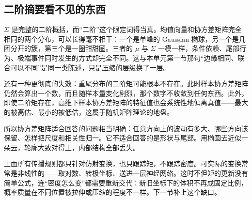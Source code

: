 \subsection{二阶摘要看不见的东西}

\(\Sigma\) 是完整的二阶概括，而``二阶''这个限定词得当真。均值向量和协方差矩阵完全相同的两个分布，可以长得毫不相干：一个是单峰的 Gaussian 椭球，另一个是几团分开的簇，第三个是一圈甜甜圈。三者的 \(\mu\) 与 \(\Sigma\) 一模一样，条件依赖、尾部行为、极端事件同时发生的方式却完全不同。这与本单元第一节那句``边缘相同、联合可以不同''是同一类陈述，只是压缩的层级换了一层。

还有一种更彻底的失效：重尾分布的二阶矩可能根本不存在。此时样本协方差矩阵仍然会算出一个数，而且随样本量变化剧烈，那个数字不收敛到任何东西。此外，即使二阶矩存在，高维下样本协方差矩阵的特征值也会系统性地偏离真值——最大的被高估、最小的被低估，这属于随机矩阵理论的地盘。

所以协方差矩阵适合回答的问题相当明确：任意方向上的波动有多大、哪些方向该保留、怎样把尺度和相关性归一。它不适合回答的是形状与尾部。用椭圆去近似一朵云，轮廓大致对得上，内部结构全部丢失。

上面所有传播规则都只针对仿射变换，也只跟踪矩，不跟踪密度。可实际的变换常常是非线性的——取对数、转极坐标、送进一层神经网络。这时不但矩的更新没有简单公式，连``密度怎么变''都需要重新交代：新旧坐标下的体积不再成固定比例，概率质量在不同位置被拉伸或压缩的程度不一样。下一节补上这个缺口。
